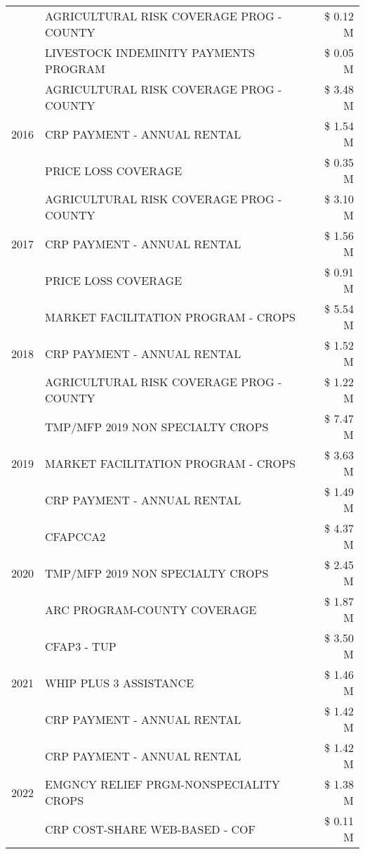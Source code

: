 \begin{tabular}{llr}
 & AGRICULTURAL RISK COVERAGE PROG - COUNTY & \$ 0.12 M \\
 & LIVESTOCK INDEMINITY PAYMENTS PROGRAM & \$ 0.05 M \\
\cline{1-3}
\multirow[t]{3}{*}{2016} & AGRICULTURAL RISK COVERAGE PROG - COUNTY & \$ 3.48 M \\
 & CRP PAYMENT - ANNUAL RENTAL & \$ 1.54 M \\
 & PRICE LOSS COVERAGE & \$ 0.35 M \\
\cline{1-3}
\multirow[t]{3}{*}{2017} & AGRICULTURAL RISK COVERAGE PROG - COUNTY & \$ 3.10 M \\
 & CRP PAYMENT - ANNUAL RENTAL & \$ 1.56 M \\
 & PRICE LOSS COVERAGE & \$ 0.91 M \\
\cline{1-3}
\multirow[t]{3}{*}{2018} & MARKET FACILITATION PROGRAM - CROPS & \$ 5.54 M \\
 & CRP PAYMENT - ANNUAL RENTAL & \$ 1.52 M \\
 & AGRICULTURAL RISK COVERAGE PROG - COUNTY & \$ 1.22 M \\
\cline{1-3}
\multirow[t]{3}{*}{2019} & TMP/MFP 2019 NON SPECIALTY CROPS & \$ 7.47 M \\
 & MARKET FACILITATION PROGRAM - CROPS & \$ 3.63 M \\
 & CRP PAYMENT - ANNUAL RENTAL & \$ 1.49 M \\
\cline{1-3}
\multirow[t]{3}{*}{2020} & CFAPCCA2 & \$ 4.37 M \\
 & TMP/MFP 2019 NON SPECIALTY CROPS & \$ 2.45 M \\
 & ARC PROGRAM-COUNTY COVERAGE & \$ 1.87 M \\
\cline{1-3}
\multirow[t]{3}{*}{2021} & CFAP3 - TUP & \$ 3.50 M \\
 & WHIP PLUS 3 ASSISTANCE & \$ 1.46 M \\
 & CRP PAYMENT - ANNUAL RENTAL & \$ 1.42 M \\
\cline{1-3}
\multirow[t]{3}{*}{2022} & CRP PAYMENT - ANNUAL RENTAL & \$ 1.42 M \\
 & EMGNCY RELIEF PRGM-NONSPECIALITY CROPS & \$ 1.38 M \\
 & CRP COST-SHARE WEB-BASED - COF & \$ 0.11 M \\
\cline{1-3}
\bottomrule
\end{tabular}
